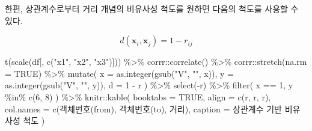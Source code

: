 \documentclass[
]{book}
\newenvironment{Shaded}{\begin{snugshade}}{\end{snugshade}}
\newcommand{\AttributeTok}[1]{\textcolor[rgb]{0.77,0.63,0.00}{#1}}
\newcommand{\ConstantTok}[1]{\textcolor[rgb]{0.00,0.00,0.00}{#1}}
\newcommand{\DecValTok}[1]{\textcolor[rgb]{0.00,0.00,0.81}{#1}}
\newcommand{\FunctionTok}[1]{\textcolor[rgb]{0.00,0.00,0.00}{#1}}
\newcommand{\NormalTok}[1]{#1}
\newcommand{\SpecialCharTok}[1]{\textcolor[rgb]{0.00,0.00,0.00}{#1}}
\newcommand{\StringTok}[1]{\textcolor[rgb]{0.31,0.60,0.02}{#1}}
\begin{document}
한편, 상관계수로부터 거리 개념의 비유사성 척도를 원하면 다음의 척도를 사용할 수 있다.

\begin{equation*}
d(\mathbf{x}_i, \mathbf{x}_j) = 1 - r_{ij}
\end{equation*}

\begin{Shaded}
\begin{Highlighting}[]
\FunctionTok{t}\NormalTok{(}\FunctionTok{scale}\NormalTok{(df[, }\FunctionTok{c}\NormalTok{(}\StringTok{"x1"}\NormalTok{, }\StringTok{"x2"}\NormalTok{, }\StringTok{"x3"}\NormalTok{)])) }\SpecialCharTok{\%\textgreater{}\%} 
\NormalTok{  corrr}\SpecialCharTok{::}\FunctionTok{correlate}\NormalTok{() }\SpecialCharTok{\%\textgreater{}\%} 
\NormalTok{  corrr}\SpecialCharTok{::}\FunctionTok{stretch}\NormalTok{(}\AttributeTok{na.rm =} \ConstantTok{TRUE}\NormalTok{) }\SpecialCharTok{\%\textgreater{}\%}
  \FunctionTok{mutate}\NormalTok{(}
    \AttributeTok{x =} \FunctionTok{as.integer}\NormalTok{(}\FunctionTok{gsub}\NormalTok{(}\StringTok{"V"}\NormalTok{, }\StringTok{""}\NormalTok{, x)),}
    \AttributeTok{y =} \FunctionTok{as.integer}\NormalTok{(}\FunctionTok{gsub}\NormalTok{(}\StringTok{"V"}\NormalTok{, }\StringTok{""}\NormalTok{, y)),}
    \AttributeTok{d =} \DecValTok{1} \SpecialCharTok{{-}}\NormalTok{ r}
\NormalTok{  ) }\SpecialCharTok{\%\textgreater{}\%}
  \FunctionTok{select}\NormalTok{(}\SpecialCharTok{{-}}\NormalTok{r) }\SpecialCharTok{\%\textgreater{}\%}
  \FunctionTok{filter}\NormalTok{(}
\NormalTok{    x }\SpecialCharTok{==} \DecValTok{1}\NormalTok{,}
\NormalTok{    y }\SpecialCharTok{\%in\%} \FunctionTok{c}\NormalTok{(}\DecValTok{6}\NormalTok{, }\DecValTok{8}\NormalTok{)}
\NormalTok{  ) }\SpecialCharTok{\%\textgreater{}\%}
\NormalTok{  knitr}\SpecialCharTok{::}\FunctionTok{kable}\NormalTok{(}
    \AttributeTok{booktabs =} \ConstantTok{TRUE}\NormalTok{,}
    \AttributeTok{align =} \FunctionTok{c}\NormalTok{(}\StringTok{\textquotesingle{}r\textquotesingle{}}\NormalTok{, }\StringTok{\textquotesingle{}r\textquotesingle{}}\NormalTok{, }\StringTok{\textquotesingle{}r\textquotesingle{}}\NormalTok{),}
    \AttributeTok{col.names =} \FunctionTok{c}\NormalTok{(}\StringTok{\textquotesingle{}객체번호(from)\textquotesingle{}}\NormalTok{, }\StringTok{\textquotesingle{}객체번호(to)\textquotesingle{}}\NormalTok{, }\StringTok{\textquotesingle{}거리\textquotesingle{}}\NormalTok{),}
    \AttributeTok{caption =} \StringTok{\textquotesingle{}상관계수 기반 비유사성 척도\textquotesingle{}}
\NormalTok{  )}
\end{Highlighting}
\end{Shaded}
\end{document}
